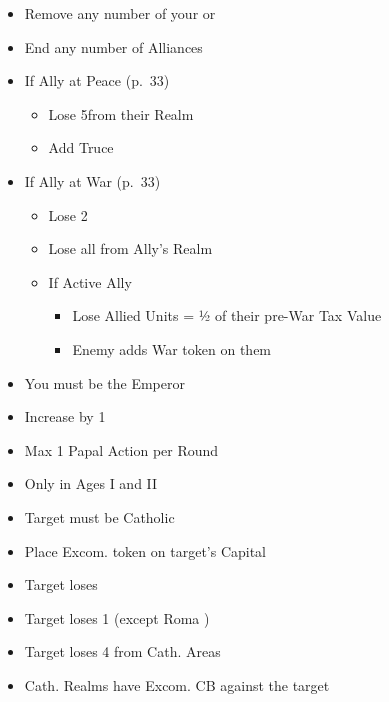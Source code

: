 \documentclass[10pt]{article}
\begin{document}
\begin{itemize}
	\item Remove any number of your \influence or \claims
	\item End any number of Alliances
	\item If Ally at Peace (p.~33)
	\begin{itemize}
		\item Lose 5\influence from their Realm
		\item Add Truce
	\end{itemize}
	\item If Ally at War (p.~33)
	\begin{itemize}
		\item Lose 2\stability
		\item Lose all \influence from Ally's Realm
		\item If Active Ally
		\begin{itemize}
			\item Lose Allied Units = ½ of their pre-War Tax Value
			\item Enemy adds War token on them
		\end{itemize}
	\end{itemize}
\end{itemize}

\begin{itemize}
	\item You must be the Emperor
	\item Increase \authority by 1
\end{itemize}

\framebreak %
\begin{itemize}
	\item Max 1 Papal Action per Round
	\item Only in Ages I and II
\end{itemize}

\begin{itemize}
	\item Target must be Catholic
	\item Place Excom. token on target's Capital
	\item Target loses 
	\item Target loses 1 \cardinal (except Roma \cardinal)
	\item Target loses 4 \influence from Cath. Areas
	\item Cath. Realms have Excom. CB against the target
\end{itemize}
\end{document}
